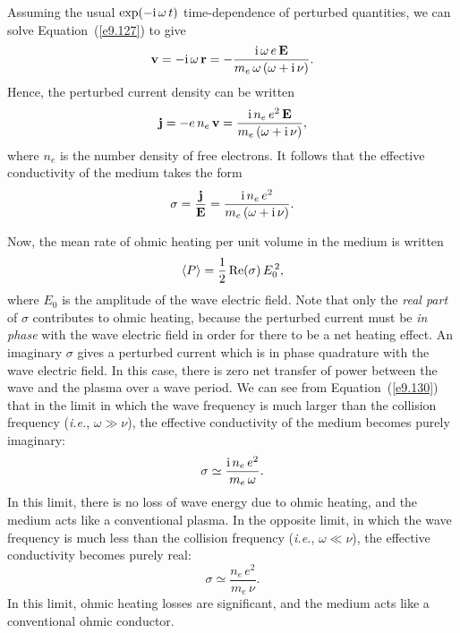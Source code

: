Assuming the usual $\exp(-{\rm i}\,\omega\,t)$ time-dependence of
perturbed quantities, we can solve Equation~(\ref{e9.127})
to give
\begin{equation}\label{e9.128}
{\bf v} = -{\rm i}\,\omega\,{\bf r} = - \frac{{\rm i}\,\omega\,e\,{\bf E}}{m_e\,\omega\,(\omega+{\rm i}\,\nu)}.
\end{equation}
Hence, the perturbed current density can be written
\begin{equation}
{\bf j} = - e\,n_e\,{\bf v} = \frac{{\rm i}\,n_e\,e^2 \,{\bf E}}{m_e\,(\omega+{\rm i}\,\nu)},
\end{equation}
where $n_e$ is the number density of free electrons.
It follows that the effective conductivity of the medium takes the form
\begin{equation}\label{e9.130}
\sigma = \frac{{\bf j}}{{\bf E}} = \frac{{\rm i}\,n_e\,e^2}{m_e\,(\omega+{\rm i}\,\nu)}.
\end{equation}

Now, the mean rate of ohmic heating per unit volume in the medium is
written
\begin{equation}
\langle P\rangle = \frac{1}{2} \,{\rm Re}(\sigma)\,E_0^{\,2},
\end{equation}
where $E_0$ is the amplitude of the wave electric field. Note that
only the {\em real part}\/ of $\sigma$ contributes to ohmic heating, because the
perturbed current must be {\em in phase} with the wave electric field
in order for there to be a net heating effect. An imaginary $\sigma$ gives a
perturbed current which is in phase quadrature with the wave electric field.
In this case, there is zero net transfer of power between the wave and the plasma over a wave period. We can see from Equation~(\ref{e9.130})
that in the limit in which the wave frequency is much larger than the
collision frequency ({\em i.e.}, $\omega\gg \nu$), the effective
conductivity of the medium becomes purely imaginary:
\begin{equation}
\sigma \simeq  \frac{{\rm i}\,n_e\,e^2}{m_e\,\omega}.
\end{equation}
In this limit, there is no loss of wave energy due to ohmic heating, and
the medium acts like a conventional plasma. In the opposite limit, in which
the wave frequency is much less than the collision frequency ({\em i.e.}, $\omega\ll\nu$), the effective conductivity becomes purely real:
\begin{equation}\label{e9.133}
\sigma \simeq  \frac{n_e\,e^2}{m_e\,\nu}.
\end{equation}
In this limit, ohmic heating losses are significant, and the medium acts like
a conventional ohmic conductor.

